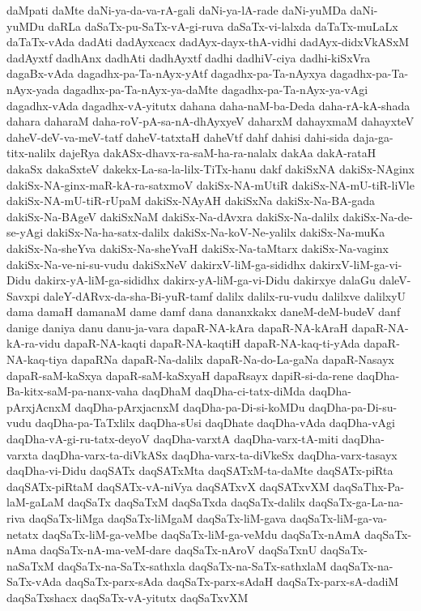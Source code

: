 {daMpati
daMte
daNi-ya-da-va-rA-gali
daNi-ya-lA-rade
daNi-yuMDa
daNi-yuMDu
daRLa
daSaTx-pu-SaTx-vA-gi-ruva
daSaTx-vi-lalxda
daTaTx-muLaLx
daTaTx-vAda
dadAti
dadAyxcacx
dadAyx-dayx-thA-vidhi
dadAyx-didxVkASxM
dadAyxtf
dadhAnx
dadhAti
dadhAyxtf
dadhi
dadhiV-ciya
dadhi-kiSxVra
dagaBx-vAda
dagadhx-pa-Ta-nAyx-yAtf
dagadhx-pa-Ta-nAyxya
dagadhx-pa-Ta-nAyx-yada
dagadhx-pa-Ta-nAyx-ya-daMte
dagadhx-pa-Ta-nAyx-ya-vAgi
dagadhx-vAda
dagadhx-vA-yitutx
dahana
daha-naM-ba-Deda
daha-rA-kA-shada
dahara
daharaM
daha-roV-pA-sa-nA-dhAyxyeV
daharxM
dahayxmaM
dahayxteV
daheV-deV-va-meV-tatf
daheV-tatxtaH
daheVtf
dahf
dahisi
dahi-sida
daja-ga-titx-nalilx
dajeRya
dakASx-dhavx-ra-saM-ha-ra-nalalx
dakAa
dakA-rataH
dakaSx
dakaSxteV
dakekx-La-sa-la-lilx-TiTx-hanu
dakf
dakiSxNA
dakiSx-NAginx
dakiSx-NA-ginx-maR-kA-ra-satxmoV
dakiSx-NA-mUtiR
dakiSx-NA-mU-tiR-liVle
dakiSx-NA-mU-tiR-rUpaM
dakiSx-NAyAH
dakiSxNa
dakiSx-Na-BA-gada
dakiSx-Na-BAgeV
dakiSxNaM
dakiSx-Na-dAvxra
dakiSx-Na-dalilx
dakiSx-Na-de-se-yAgi
dakiSx-Na-ha-satx-dalilx
dakiSx-Na-koV-Ne-yalilx
dakiSx-Na-muKa
dakiSx-Na-sheYva
dakiSx-Na-sheYvaH
dakiSx-Na-taMtarx
dakiSx-Na-vaginx
dakiSx-Na-ve-ni-su-vudu
dakiSxNeV
dakirxV-liM-ga-sididhx
dakirxV-liM-ga-vi-Didu
dakirx-yA-liM-ga-sididhx
dakirx-yA-liM-ga-vi-Didu
dakirxye
dalaGu
daleV-Savxpi
daleY-dARvx-da-sha-Bi-yuR-tamf
dalilx
dalilx-ru-vudu
dalilxve
dalilxyU
dama
damaH
damanaM
dame
damf
dana
dananxkakx
daneM-deM-budeV
danf
danige
daniya
danu
danu-ja-vara
dapaR-NA-kAra
dapaR-NA-kAraH
dapaR-NA-kA-ra-vidu
dapaR-NA-kaqti
dapaR-NA-kaqtiH
dapaR-NA-kaq-ti-yAda
dapaR-NA-kaq-tiya
dapaRNa
dapaR-Na-dalilx
dapaR-Na-do-La-gaNa
dapaR-Nasayx
dapaR-saM-kaSxya
dapaR-saM-kaSxyaH
dapaRsayx
dapiR-si-da-rene
daqDha-Ba-kitx-saM-pa-nanx-vaha
daqDhaM
daqDha-ci-tatx-diMda
daqDha-pArxjAcnxM
daqDha-pArxjacnxM
daqDha-pa-Di-si-koMDu
daqDha-pa-Di-su-vudu
daqDha-pa-TaTxlilx
daqDha-sUsi
daqDhate
daqDha-vAda
daqDha-vAgi
daqDha-vA-gi-ru-tatx-deyoV
daqDha-varxtA
daqDha-varx-tA-miti
daqDha-varxta
daqDha-varx-ta-diVkASx
daqDha-varx-ta-diVkeSx
daqDha-varx-tasayx
daqDha-vi-Didu
daqSATx
daqSATxMta
daqSATxM-ta-daMte
daqSATx-piRta
daqSATx-piRtaM
daqSATx-vA-niVya
daqSATxvX
daqSATxvXM
daqSaThx-Pa-laM-gaLaM
daqSaTx
daqSaTxM
daqSaTxda
daqSaTx-dalilx
daqSaTx-ga-La-na-riva
daqSaTx-liMga
daqSaTx-liMgaM
daqSaTx-liM-gava
daqSaTx-liM-ga-va-netatx
daqSaTx-liM-ga-veMbe
daqSaTx-liM-ga-veMdu
daqSaTx-nAmA
daqSaTx-nAma
daqSaTx-nA-ma-veM-dare
daqSaTx-nAroV
daqSaTxnU
daqSaTx-naSaTxM
daqSaTx-na-SaTx-sathxla
daqSaTx-na-SaTx-sathxlaM
daqSaTx-na-SaTx-vAda
daqSaTx-parx-sAda
daqSaTx-parx-sAdaH
daqSaTx-parx-sA-dadiM
daqSaTxshacx
daqSaTx-vA-yitutx
daqSaTxvXM
}
